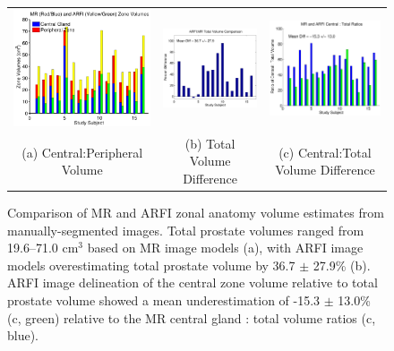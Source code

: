 \begin{figure}[htb!]
\centering
\begin{tabular}{ccc}
\includegraphics[width=0.3\linewidth]{figs/mr_arfi_volumes} &
\includegraphics[width=0.3\linewidth]{figs/mr_arfi_volume_diff} &
\includegraphics[width=0.3\linewidth]{figs/mr_arfi_central_total_diff} \\
(a) Central:Peripheral Volume & (b) Total Volume Difference & (c) Central:Total Volume Difference\\
\end{tabular}
\caption{Comparison of MR and ARFI zonal anatomy volume estimates from manually-segmented images.  Total prostate volumes ranged from 19.6--71.0 cm$^3$ based on MR image models (a), with ARFI image models overestimating total prostate volume by 36.7 $\pm$ 27.9\% (b).  ARFI image delineation of the central zone volume relative to total prostate volume showed a mean underestimation of -15.3 $\pm$ 13.0\% (c, green) relative to the MR central gland : total volume ratios (c, blue).}
\label{fig:mr_arfi_volumes} 
\end{figure}
